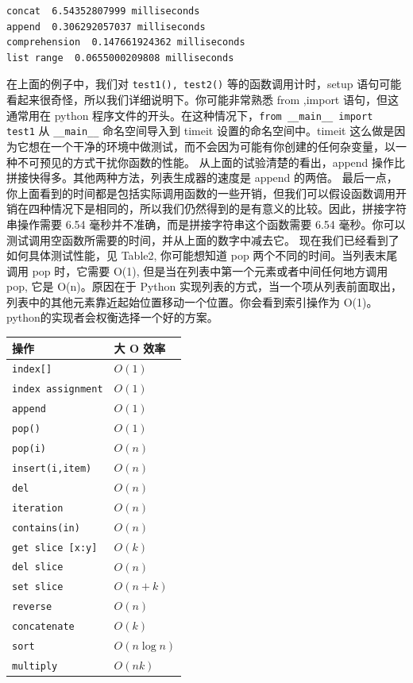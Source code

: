 \begin{lstlisting}[frame=no]
concat  6.54352807999 milliseconds
append  0.306292057037 milliseconds
comprehension  0.147661924362 milliseconds
list range  0.0655000209808 milliseconds
\end{lstlisting}
在上面的例子中，我们对 \lstinline|test1(), test2()| 等的函数调用计时，setup 语句可能看起来很奇怪，所以我们详细说明下。你可能非常熟悉 from ,import 语句，但这通常用在 python 程序文件的开头。在这种情况下，\lstinline|from __main__ import test1| 从 \lstinline|__main__| 命名空间导入到 timeit 设置的命名空间中。timeit 这么做是因为它想在一个干净的环境中做测试，而不会因为可能有你创建的任何杂变量，以一种不可预见的方式干扰你函数的性能。
从上面的试验清楚的看出，append 操作比拼接快得多。其他两种方法，列表生成器的速度是 append 的两倍。
最后一点，你上面看到的时间都是包括实际调用函数的一些开销，但我们可以假设函数调用开销在四种情况下是相同的，所以我们仍然得到的是有意义的比较。因此，拼接字符串操作需要 6.54 毫秒并不准确，而是拼接字符串这个函数需要 6.54 毫秒。你可以测试调用空函数所需要的时间，并从上面的数字中减去它。
现在我们已经看到了如何具体测试性能，见 Table2, 你可能想知道 pop 两个不同的时间。当列表末尾调用 pop 时，它需要 O(1), 但是当在列表中第一个元素或者中间任何地方调用 pop, 它是 O(n)。原因在于 Python 实现列表的方式，当一个项从列表前面取出，列表中的其他元素靠近起始位置移动一个位置。你会看到索引操作为 O(1)。python的实现者会权衡选择一个好的方案。

\begin{table}[htbp]
\centering
\begin{tabular}{ll} \hline
操作&大 O 效率 \\\hline
\lstinline|index[]|         & $O(1)$ \\
\lstinline|index assignment|& $O(1)$ \\
\lstinline|append|          & $O(1)$ \\
\lstinline|pop()|           & $O(1)$ \\
\lstinline|pop(i)|          & $O(n)$ \\
\lstinline|insert(i,item)|  & $O(n)$ \\
\lstinline|del|             & $O(n)$ \\
\lstinline|iteration|       & $O(n)$ \\
\lstinline|contains(in)|    & $O(n)$ \\
\lstinline|get slice [x:y]| & $O(k)$ \\
\lstinline|del slice|       & $O(n)$ \\
\lstinline|set slice|       & $O(n+k)$ \\
\lstinline|reverse|         & $O(n)$ \\
\lstinline|concatenate|     & $O(k)$ \\
\lstinline|sort|            & $O(n\log n)$ \\
\lstinline|multiply|        & $O(nk)$ \\\hline 
\end{tabular}
\end{table}


